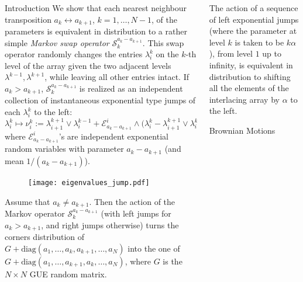 \documentclass[english,final,t]{beamer}
\begin{document}
\begin{frame}{}
\begin{columns}[t]
\begin{column}{.26\linewidth}
\begin{block}{Introduction}
We show that each nearest neighbour transposition
$a_k\leftrightarrow a_{k+1}$, $k=1,\ldots,N-1 $, of the parameters
is equivalent in distribution to a 
rather simple \emph{Markov swap operator}
$\mathscr{S}^{a_k-a_{k+1}}_k$. 
This swap operator
randomly changes the entries $\lambda^k_i$
on the $k$-th level of the array given the 
two adjacent levels $\lambda^{k-1},\lambda^{k+1}$,
while leaving all other entries intact.
If $a_k>a_{k+1}$, 
$\mathscr{S}^{a_k-a_{k+1}}_k$
is realized as an independent collection of instantaneous
exponential type jumps of each $\lambda^k_i$
to the left:
\begin{equation*}
    	\lambda^{k}_i\mapsto \nu^k_i:=
	\lambda^{k+1}_{i+1}\vee \lambda^{k-1}_{i}
	+
	\mathscr{E}_{a_k-a_{k+1}}^i\wedge
	\bigl(
		\lambda^k_i-
		\lambda^{k+1}_{i+1}\vee \lambda^{k-1}_{i}
	\bigr),
\end{equation*}
where $\mathscr{E}_{a_k-a_{k+1}}^{i}$'s are independent exponential random variables
with parameter $a_k-a_{k+1}$ (and mean $1 / (a_k-a_{k+1})$).
            \end{block}
            \begin{figure}[htpb]
                \centering
                \texttt{[image: eigenvalues\_jump.pdf]}
                \label{fig:jump}
            \end{figure}
\begin{theorem}
    \label{thm:main_swap}
    Assume that $a_k\ne a_{k+1}$. Then the action of the Markov operator
    $\mathscr{S}^{a_k-a_{k+1}}_k$ (with left jumps for $a_k>a_{k+1}$, and right jumps otherwise)
    turns the corners distribution of $G+\mathrm{diag}(a_1,\ldots,a_k,a_{k+1},\ldots,a_N )$
    into the one of $G+\mathrm{diag}(a_1,\ldots,a_{k+1},a_{k},\ldots,a_N )$,
    where $G$ is the $N\times N$ GUE random matrix.
\end{theorem} 

\end{column}
\begin{column}{.26\linewidth}
    \begin{theorem}
        \label{thm:main_theorem_shift}
        The action of a sequence of left exponential jumps 
        (where the parameter at level $k$ is taken to be $k\alpha$), from level $1$
        up to infinity, is equivalent in distribution 
        to shifting all the 
        elements of the interlacing array by $\alpha$ to the left.
    \end{theorem}  

\begin{block}{Brownian Motions}
\justifying
    


\end{block}
\end{column}
\end{columns}
\end{frame}
\end{document}
